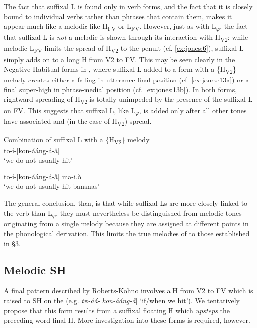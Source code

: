 \documentclass[output=paper,newtxmath,modfonts,nonflat,draft]{langsci/langscibook}
\begin{document}
The fact that suffixal L is found only in verb forms, and the fact that it is closely bound to individual verbs rather than phrases that contain them, makes it appear much like a melodic  like H\textsubscript{FV} or L\textsubscript{FV}. However, just as with L\textsubscript{$\varphi $}, the fact that suffixal L is \textit{not} a melodic  is shown through its interaction with H\textsubscript{V2}: while melodic L\textsubscript{FV} limits the spread of H\textsubscript{V2} to the penult (cf. \ref{ex:jones:6}), suffixal L simply adds on to a long H  from V2 to FV. This may be seen clearly in the Negative Habitual forms in , where suffixal L added to a form with a \{H\textsubscript{V2}\} melody creates either a falling  in utterance-final position (cf. \ref{ex:jones:13a}) or a final super-high  in phrase-medial position (cf. \ref{ex:jones:13b}). In both forms, rightward spreading of H\textsubscript{V2} is totally unimpeded by the presence of the suffixal L on FV. This suggests that suffixal L, like L\textsubscript{$\varphi $}, is added only after all other tones have associated and (in the case of H\textsubscript{V2}) spread.

\ea\label{ex:jones:13}
{Combination of suffixal L with a \{H\textsubscript{V2}\} melody}\\
\ea\label{ex:jones:13a}
{to-í-[kon-ááng-á-â]} \\
\glt ‘we do not usually hit’

\ex\label{ex:jones:13b}
{to-í-[kon-ááng-á-\H{a}] ma-i.\`o}\\
\glt ‘we do not usually hit bananas’
\z
\z

The general conclusion, then, is that while suffixal Ls are more closely linked to the verb than L\textsubscript{$\varphi $},  they must nevertheless be distinguished from melodic tones originating from a single melody because they are assigned at different points in the phonological derivation. This limits the true melodies of  to those established in §3.

\subsection{Melodic SH}\label{sec:jones:4.4}
  A final  pattern described by Roberts-Kohno involves a H  from V2 to FV which is raised to SH on the  (e.g. \textit{tw-áá-}[\textit{kon-ááng-\H{a}}] ‘if/when we hit’). We tentatively propose that this form results from a suffixal floating H  which \textit{upsteps} the preceding word-final H. More investigation into these forms is required, however.
\end{document}
